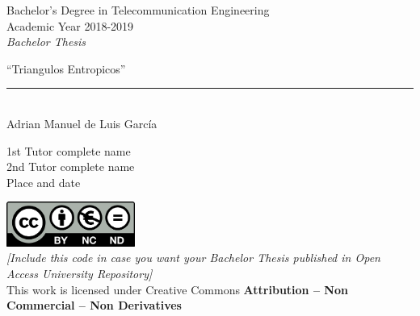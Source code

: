 \documentclass[12pt]{report}
\begin{document}
	
\begin{titlepage}
	\begin{sffamily}
	\color{azulUC3M}
	\begin{center}
		\begin{figure}[H] %
		\end{figure}
		\vspace{2.5cm}
		\begin{Large}
			Bachelor's Degree in Telecommunication Engineering\\			
			Academic Year 2018-2019\\
			\vspace{2cm}		
			\textsl{Bachelor Thesis}
			\bigskip
			
		\end{Large}
		 	{\Huge ``Triangulos Entropicos''}\\
		 	\vspace*{0.5cm}
	 		\rule{10.5cm}{0.1mm}\\
			\vspace*{0.9cm}
			{\LARGE Adrian Manuel de Luis García}\\ 
			\vspace*{1cm}
		\begin{Large}
			1st Tutor complete name\\
			2nd Tutor complete name\\
			Place and date\\
		\end{Large}
	\end{center}
	\vfill
	\color{black}
	\includegraphics[width=4.2cm]{imagenes/creativecommons.png}\\  %
	\emph{[Include this code in case you want your Bachelor Thesis published in Open Access University Repository]}\\ %
	This work is licensed under Creative Commons \textbf{Attribution – Non Commercial – Non Derivatives}
	\end{sffamily}
\end{titlepage}
\end{document}
